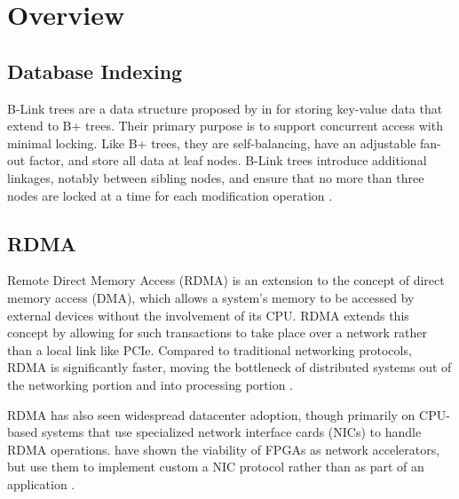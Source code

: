 \section{Overview}

\subsection{Database Indexing}



B-Link trees are a data structure proposed by \citeauthor{b-link} in \citeyear{b-link} for storing key-value data that extend to B+ trees.
Their primary purpose is to support concurrent access with minimal locking.
Like B+ trees, they are self-balancing, have an adjustable fan-out factor, and store all data at leaf nodes.
B-Link trees introduce additional linkages, notably between sibling nodes, and ensure that no more than three nodes are locked at a time for each modification operation \cite{b-link}.


\subsection{RDMA}

Remote Direct Memory Access (RDMA) is an extension to the concept of direct memory access (DMA), which allows a system's memory to be accessed by external devices without the involvement of its CPU. RDMA extends this concept by allowing for such transactions to take place over a network rather than a local link like PCIe. Compared to traditional networking protocols, RDMA is significantly faster, moving the bottleneck of distributed systems out of the networking portion and into processing portion \cite{binnig-vldb-2016}.

RDMA has also seen widespread datacenter adoption, though primarily on CPU-based systems that use specialized network interface cards (NICs) to handle RDMA operations. \citeauthor{star} have shown the viability of FPGAs as network accelerators, but use them to implement custom a NIC protocol rather than as part of an application \cite{star}.

